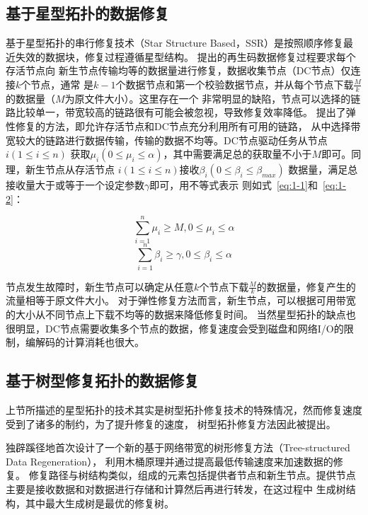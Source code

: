 \subsection{基于星型拓扑的数据修复}
基于星型拓扑的串行修复技术（Star Structure Based，SSR）是按照顺序修复最近失效的数据块，修复过程遵循星型结构。
\citet{dimakis2010network,wu2007deterministic}提出的再生码数据修复过程要求每个存活节点向
新生节点传输均等的数据量进行修复，数据收集节点（DC节点）仅连接$k$个节点，通常
是$k-1$个数据节点和第一个校验数据节点，并从每个节点下载$\frac{M}{k}$的数据量（$M$为原文件大小）。这里存在一个
非常明显的缺陷，节点可以选择的链路比较单一，带宽较高的链路很有可能会被忽视，导致修复效率降低。
\citet{shah2010flexible}提出了弹性修复的方法，即允许存活节点和DC节点充分利用所有可用的链路，
从中选择带宽较大的链路进行数据传输，传输的数据不均等。DC节点驱动任务从节点$i(1 \leqslant i \leqslant n)$
获取$\mu_i (0 \leqslant \mu_i \leqslant \alpha)$，其中需要满足总的获取量不小于$M$即可。同理，新生节点从存活节点
$i(1 \leqslant i \leqslant n)$接收$\beta_i (0 \leqslant \beta_i \leqslant \beta_{max})$
数据量，满足总接收量大于或等于一个设定参数$\gamma$即可，用不等式表示
则如式~\ref{eq:1-1}和~\ref{eq:1-2}：

\begin{equation}
	\label{eq:1-1}
	\sum_{i=1}^{n} \mu_{i} \geq M, 0 \leq \mu_{i} \leq \alpha
\end{equation}
\begin{equation}
	\label{eq:1-2}
	\sum_{i=1}^{n} \beta_{i} \geq \gamma, 0 \leq \beta_{i} \leq \alpha
\end{equation}

节点发生故障时，新生节点可以确定从任意$k$个节点下载$\frac{M}{k}$的数据量，修复产生的流量相等于原文件大小。
对于弹性修复方法而言，新生节点，可以根据可用带宽的大小从不同节点上下载不均等的数据来降低修复时间。
当然星型拓扑的缺点也很明显，DC节点需要收集多个节点的数据，修复速度会受到磁盘和网络I/O的限制，编解码的计算消耗也很大。

\subsection{基于树型修复拓扑的数据修复}
上节所描述的星型拓扑的技术其实是树型拓扑修复技术的特殊情况，然而修复速度受到了诸多的制约，为了提升修复的速度，
树型拓扑修复方法因此被提出。

\citet{li2009tree,li2010tree}独辟蹊径地首次设计了一个新的基于网络带宽的树形修复方法（Tree-structured Data Regeneration），
利用木桶原理并通过提高最低传输速度来加速数据的修复。
修复路径与树结构类似，组成的元素包括提供者节点和新生节点。提供节点主要是接收数据和对数据进行存储和计算然后再进行转发，在这过程中
生成树结构，其中最大生成树是最优的修复树。


